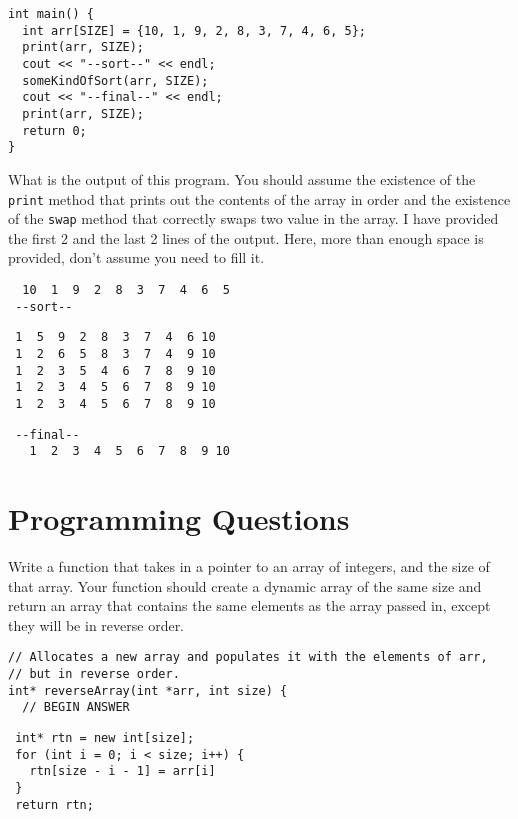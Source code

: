 \documentclass[11pt,answers]{exam}
\begin{document}
\begin{questions}
\begin{lstlisting}
int main() {
  int arr[SIZE] = {10, 1, 9, 2, 8, 3, 7, 4, 6, 5};  
  print(arr, SIZE);
  cout << "--sort--" << endl;
  someKindOfSort(arr, SIZE);
  cout << "--final--" << endl;
  print(arr, SIZE);
  return 0;
}
\end{lstlisting}
\newpage
What is the output of this program. You should assume the existence of the {\tt print} method that prints out the contents of the array in order and the existence of the {\tt swap} method that correctly swaps two value in the array. I have provided the first 2 and the last 2 lines of the output. Here, more than enough space is provided, don't assume you need to fill it.
\newline
\newline
\begin{verbatim}
  10  1  9  2  8  3  7  4  6  5
 --sort--  
\end{verbatim}
\begin{solution}[5.5in]
\begin{verbatim}
 1  5  9  2  8  3  7  4  6 10
 1  2  6  5  8  3  7  4  9 10
 1  2  3  5  4  6  7  8  9 10
 1  2  3  4  5  6  7  8  9 10
 1  2  3  4  5  6  7  8  9 10
\end{verbatim}
\end{solution}
\begin{verbatim}
 --final--
   1  2  3  4  5  6  7  8  9 10 
\end{verbatim}


\newpage
\section*{Programming Questions}

\question[15] Write a function that takes in a pointer to an array of integers, and the size of that array. Your function should create a dynamic array of the same size and return an array that contains the same elements as the array passed in, except they will be in reverse order.

\begin{verbatim}
// Allocates a new array and populates it with the elements of arr,
// but in reverse order.
int* reverseArray(int *arr, int size) {
  // BEGIN ANSWER
\end{verbatim}

\begin{solution}[6in]
\begin{lstlisting}
 int* rtn = new int[size];
 for (int i = 0; i < size; i++) {
   rtn[size - i - 1] = arr[i]
 }
 return rtn;
\end{lstlisting}
\end{solution}


\end{questions}
\end{document}
